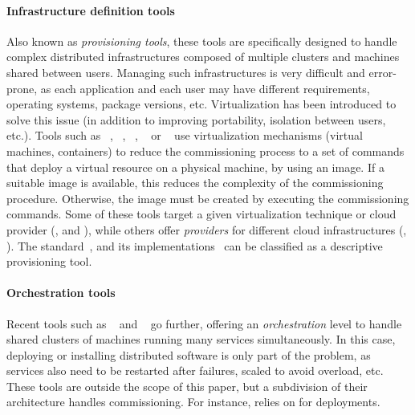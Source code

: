 \paragraph{Infrastructure definition tools}
Also known as \emph{provisioning tools}, these tools are specifically
designed to handle complex distributed infrastructures composed of
multiple clusters and machines shared between users. Managing such
infrastructures is very difficult and error-prone, as each application
and each user may have different requirements, operating systems,
package versions, etc. Virtualization has been introduced to solve
this issue (in addition to improving portability, isolation between
users, etc.). Tools such as \docker~\cite{docker:web},
\terraform~\cite{terraform:web}, \juju~\cite{juju:web},
\cloudformation~\cite{cloudf:web} or \heat~\cite{heat:web} use
virtualization mechanisms (\eg virtual machines, containers) to reduce
the commissioning process to a set of commands that deploy a virtual
resource on a physical machine, by using an image. If a suitable image
is available, this reduces the complexity of the
commissioning procedure. Otherwise, the image must be created by
executing the commissioning commands. Some of these tools target a given virtualization
technique or cloud provider (\eg \docker, \cloudformation and
\heat), while others offer \emph{providers} for different
cloud infrastructures (\eg \terraform, \juju). The \tosca
standard~\cite{tosca:web}, and its
implementations~\cite{Binz2013,cloudify:web,opentosca:web,8599581} can
be classified as a descriptive provisioning tool.

\paragraph{Orchestration tools}
Recent tools such as \kubernetes~\cite{kubernetes:web} and
\dockerswarm~\cite{dockerswarm:web} go further, offering an
\emph{orchestration} level to handle shared clusters of machines
running many services simultaneously. In this case, deploying or
installing distributed software is only part of the problem, as
services also need to be restarted after failures, scaled to avoid
overload, etc. These tools are outside the scope of this paper, but a
subdivision of their architecture handles commissioning. For instance,
\kubernetes relies on \docker for deployments.

